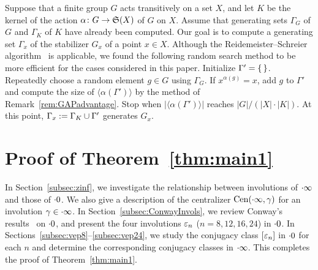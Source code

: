 \documentclass{amsart} %
\begin{document}
%
%
\begin{remark}\label{rem:gensofstab}
Suppose that a finite group $G$ acts transitively on a set $X$,
and let $K$ be the kernel of the action $\alpha\colon G\to \mathord{\mathfrak{S}}(X)$
 of $G$ on $X$.
Assume that generating sets $\Gamma_G$ of $G$ and $\Gamma_K$ of $K$ 
have already been computed.
Our goal is to compute a generating set 
$\Gamma_x$ of the stabilizer $G_x$ of a point $x\in X$.
Although the Reidemeister--Schreier algorithm~\cite[Chapter 2]{MR2109550}
is applicable, 
we found the following random search method to be more efficient
for the cases considered in this paper.
Initialize $\Gamma^{\prime}=\{\,\}$. 
Repeatedly choose a random element $g\in G$
using $\Gamma_G$. 
If $x^{\alpha(g)}=x$, add $g$ to $\Gamma'$ and compute the size
of $\langle\alpha(\Gamma')\rangle$ by the method of Remark~\ref{rem:GAPadvantage}.
Stop when $|\langle\alpha(\Gamma')\rangle|$ reaches $|G|/({|X|\cdot |K|})$.
At this point,
$\Gamma_x:=\Gamma_K\cup\Gamma^{\prime}$
generates $G_x$.
\end{remark}
%
%
\section{Proof of Theorem~\ref{thm:main1}}\label{sec:proofofmain1}
%
In Section~\ref{subsec:zinf}, 
we investigate the relationship between involutions  of $\cdot \infty$ and those of $\cdot 0$.
We also give a description of the centralizer $\mathrm{Cen}(\cdot \infty, \gamma)$
for an involution $\gamma\in \cdot \infty$.
In Section~\ref{subsec:ConwayInvols}, 
we review Conway's results~\cite[Chapter 10]{theCSbook} on $\cdot 0$, 
and present the four involutions $\varepsilon_n$ ($n=8,12,16,24$) 
 in $\cdot 0$.
In Sections~\ref{subsec:vep8}--\ref{subsec:vep24}, 
we study the conjugacy class $[\varepsilon_n]$ in $\cdot 0$ for each $n$ 
and determine the corresponding conjugacy classes in $\cdot \infty$. This completes the proof of Theorem~\ref{thm:main1}.
%
%
\end{document}
